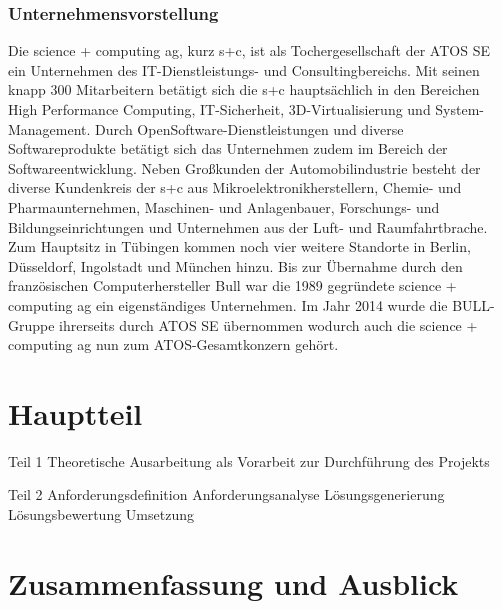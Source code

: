 \documentclass[
a4paper,   
titlepage,  
halfparskip,
12pt        
]{scrartcl}
\begin{document}
\begin{onehalfspacing}
\subsubsection{Unternehmensvorstellung}
Die science + computing ag, kurz s+c, ist als Tochergesellschaft der ATOS SE ein Unternehmen des \ac{IT}-Dienstleistungs- und Consultingbereichs. Mit seinen knapp 300 Mitarbeitern betätigt sich die s+c hauptsächlich in den Bereichen High Performance Computing, \ac{IT}-Sicherheit, 3D-Virtualisierung und System-Management. Durch OpenSoftware-Dienstleistungen und diverse Softwareprodukte betätigt sich das Unternehmen zudem im Bereich der Softwareentwicklung. Neben Großkunden der Automobilindustrie besteht der diverse Kundenkreis der s+c aus Mikroelektronikherstellern, Chemie- und Pharmaunternehmen, Maschinen- und Anlagenbauer, Forschungs- und Bildungseinrichtungen und Unternehmen aus der Luft- und Raumfahrtbrache. Zum Hauptsitz in Tübingen kommen noch vier weitere Standorte in Berlin, Düsseldorf, Ingolstadt und München hinzu. Bis zur Übernahme durch den französischen Computerhersteller Bull war die 1989 gegründete science + computing ag ein eigenständiges Unternehmen.\cite{bull} Im Jahr 2014 wurde die BULL-Gruppe ihrerseits durch ATOS SE übernommen wodurch auch die science + computing ag nun zum ATOS-Gesamtkonzern gehört.\cite{atos}


\section{Hauptteil}
\label{sec:hauptteil}

Teil 1
Theoretische Ausarbeitung als Vorarbeit zur Durchführung
des Projekts

Teil 2
Anforderungsdefinition
Anforderungsanalyse
Lösungsgenerierung
Lösungsbewertung
Umsetzung

\section{Zusammenfassung und Ausblick}
\label{sec:ausblick}



\appendix



\end{onehalfspacing}
\end{document}
